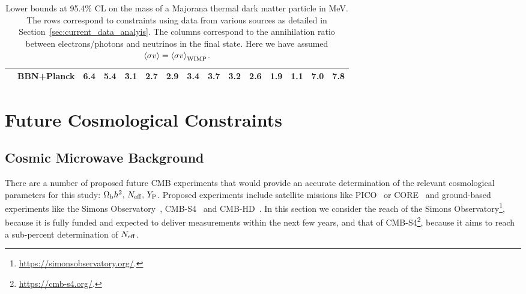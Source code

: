 \documentclass[notitlepage,letterpaper,natbib,aps,prd,onecolumn,amsmath,amsfonts,nofootinbib,preprintnumbers,superscriptaddress,secnumarabic,groupedaddress]{revtex4-1}
\begin{document}
\begin{table}[t]
\begin{center}
{\begin{tabular}{c|l|p{0.7cm}|p{0.7cm}|p{0.7cm}|p{0.7cm}|p{0.7cm}|p{0.7cm}|p{0.7cm}|p{0.7cm}|p{0.7cm}|p{0.7cm}|p{0.7cm}|p{2cm}|p{0.7cm}}
\rule{0pt}{3ex} & BBN+Planck      &    \hfil 6.4        &    \hfil 5.4        & \hfil 3.1           &  \hfil 2.7          &     \hfil 2.9       &  \hfil   3.4        &  \hfil 3.7     &\hfil  3.2           & \hfil 2.6           &    \hfil  1.9       &\hfil     1.1        &\hfil   7.0          &  \hfil 7.8          \\
 \hline\hline
\end{tabular}
}
\caption{Lower bounds at 95.4\% CL on the mass of a Majorana thermal dark matter particle in MeV. The rows correspond to constraints using data from various sources as detailed in Section~\ref{sec:current_data_analyis}. The columns correspond to the annihilation ratio between electrons/photons and neutrinos in the final state. Here we have assumed $\left<\sigma v\right> = \left<\sigma v\right>_{\rm WIMP}$. }
\label{tab:MajoranaBRBounds}
\end{center}
\end{table}











\section{Future Cosmological Constraints}\label{sec:future}


\subsection{Cosmic Microwave Background}\label{sec:future_CMB}
There are a number of proposed future CMB experiments that would provide an accurate determination of the relevant cosmological parameters for this study: $\Omega_\mathrm{b} h^2,\,N_{\rm eff},\,Y_{\rm P}$. Proposed experiments include satellite missions like PICO~\cite{Hanany:2019lle} or CORE~\cite{DiValentino:2016foa} and ground-based experiments like the Simons Observatory~\cite{Ade:2018sbj}, CMB-S4~\cite{Abazajian:2016yjj,Abazajian:2019eic} and CMB-HD~\cite{Sehgal:2019ewc}. In this section we consider the reach of the Simons Observatory\footnote{\url{https://simonsobservatory.org/}.}, because it is fully funded and expected to deliver measurements within the next few years, and that of CMB-S4\footnote{\url{https://cmb-s4.org/}.}, because it aims to reach a sub-percent determination of $N_{\rm eff}$.
\end{document}
